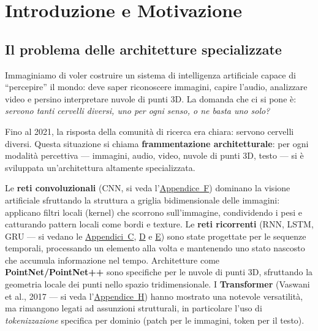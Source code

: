 \documentclass[12pt,a4paper]{article}
\begin{document}
\tableofcontents
\newpage


\section{Introduzione e Motivazione} \label{sec:intro}

\subsection{Il problema delle architetture specializzate} \label{sec:specializzate}

Immaginiamo di voler costruire un sistema di intelligenza artificiale capace di ``percepire'' il mondo: deve saper riconoscere immagini, capire l'audio, analizzare video e persino interpretare nuvole di punti 3D. La domanda che ci si pone \`e: \textit{servono tanti cervelli diversi, uno per ogni senso, o ne basta uno solo?}

Fino al 2021, la risposta della comunit\`a di ricerca era chiara: servono cervelli diversi. Questa situazione si chiama \textbf{frammentazione architetturale}: per ogni modalit\`a percettiva --- immagini, audio, video, nuvole di punti 3D, testo --- si \`e sviluppata un'architettura altamente specializzata.

Le \textbf{reti convoluzionali} (CNN, si veda l'\hyperref[app:cnn]{Appendice~F}) dominano la visione artificiale sfruttando la struttura a griglia bidimensionale delle immagini: applicano filtri locali (kernel) che scorrono sull'immagine, condividendo i pesi e catturando pattern locali come bordi e texture. Le \textbf{reti ricorrenti} (RNN, LSTM, GRU --- si vedano le \hyperref[app:rnn]{Appendici~C}, \hyperref[app:lstm]{D} e \hyperref[app:gru]{E}) sono state progettate per le sequenze temporali, processando un elemento alla volta e mantenendo uno stato nascosto che accumula informazione nel tempo. Architetture come \textbf{PointNet/PointNet++} sono specifiche per le nuvole di punti 3D, sfruttando la geometria locale dei punti nello spazio tridimensionale. I \textbf{Transformer} (Vaswani et al., 2017 --- si veda l'\hyperref[app:transformer]{Appendice~H}) hanno mostrato una notevole versatilit\`a, ma rimangono legati ad assunzioni strutturali, in particolare l'uso di \emph{tokenizzazione} specifica per dominio (patch per le immagini, token per il testo).
\end{document}
